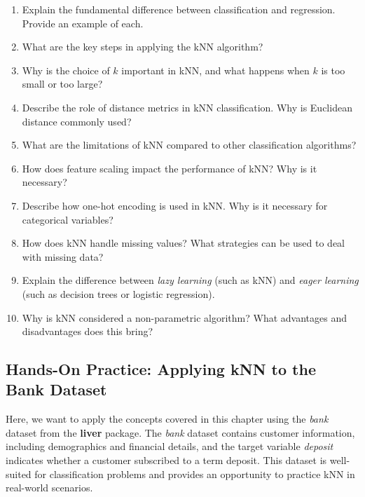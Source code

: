 \documentclass[
]{book}
\providecommand{\tightlist}{%
  \setlength{\itemsep}{0pt}\setlength{\parskip}{0pt}}
\theoremstyle{definition}
\theoremstyle{definition}
\theoremstyle{definition}
\theoremstyle{definition}
\theoremstyle{remark}
\begin{document}
\begin{enumerate}
\def\labelenumi{\arabic{enumi}.}
\tightlist
\item
  Explain the fundamental difference between classification and regression. Provide an example of each.\\
\item
  What are the key steps in applying the kNN algorithm?\\
\item
  Why is the choice of \(k\) important in kNN, and what happens when \(k\) is too small or too large?\\
\item
  Describe the role of distance metrics in kNN classification. Why is Euclidean distance commonly used?\\
\item
  What are the limitations of kNN compared to other classification algorithms?\\
\item
  How does feature scaling impact the performance of kNN? Why is it necessary?\\
\item
  Describe how one-hot encoding is used in kNN. Why is it necessary for categorical variables?\\
\item
  How does kNN handle missing values? What strategies can be used to deal with missing data?\\
\item
  Explain the difference between \emph{lazy learning} (such as kNN) and \emph{eager learning} (such as decision trees or logistic regression).\\
\item
  Why is kNN considered a non-parametric algorithm? What advantages and disadvantages does this bring?
\end{enumerate}

\subsection*{Hands-On Practice: Applying kNN to the Bank Dataset}\label{hands-on-practice-applying-knn-to-the-bank-dataset}

Here, we want to apply the concepts covered in this chapter using the \emph{bank} dataset from the \textbf{liver} package. The \emph{bank} dataset contains customer information, including demographics and financial details, and the target variable \emph{deposit} indicates whether a customer subscribed to a term deposit. This dataset is well-suited for classification problems and provides an opportunity to practice kNN in real-world scenarios.
\end{document}
